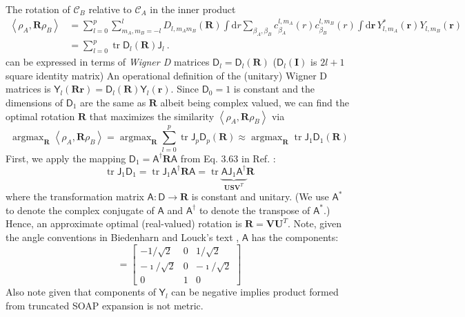 \documentclass[journal=jctcce,manuscript=article]{achemso}
\newcommand{\cref}[1]{{Ref. \citenum{#1}}}
\newcommand{\neighborhood}{\mathcal{C}}
\newcommand{\tr}{\operatorname{tr}}
\newcommand{\argmax}{\operatorname{argmax}}
\newcommand{\As}{\mathsf{A}}
\newcommand{\rb}{\mathbf{r}}
\newcommand{\Rb}{\mathbf{R}}
\newcommand{\Ib}{\mathbf{I}}
\newcommand{\Js}{\mathsf{J}}
\newcommand{\Ub}{\mathbf{U}}
\newcommand{\Vb}{\mathbf{V}}
\newcommand{\Ys}{\mathsf{Y}}
\newcommand{\Sb}{\mathbf{S}}
\newcommand{\Ds}{\mathsf{D}}
\begin{document}
The rotation of $\neighborhood_B$ relative to $\neighborhood_A$ in the inner product 
\begin{equation}
\begin{aligned}
\left<\rho_A,\Rb \rho_B\right> &= 
\sum_{l=0}^p \sum_{m_A,m_B=-l}^l  D_{l, m_A m_B}(\Rb) \int \mathrm{d}r  
\sum_{\beta_A, \beta_B} c_{\beta_A}^{l, m_A}(r)  c_{\beta_B}^{l, m_B}(r)
\int \mathrm{d}\rb \, Y^*_{l, m_A} (\rb) Y_{l, m_B}(\rb) \\
&= \sum_{l=0}^p \tr \Ds_l(\Rb) \Js_l \ .
\end{aligned}
\end{equation}
can be expressed in terms of \emph{Wigner D} matrices $\Ds_l = \Ds_l(\Rb)$ ($\Ds_l(\Ib)$ is $2l+1$ square identity matrix)
An operational definition of the (unitary) Wigner D matrices is $ \Ys_l(\Rb \rb) = \Ds_l(\Rb) \Ys_l(\rb) $. 
Since  $\Ds_0 = 1 $ is constant and the dimensions of $\Ds_1$ are the same as $\Rb$ albeit being complex valued,
we can find the optimal rotation $\Rb$ that maximizes the similarity $\left<\rho_A,\Rb \rho_B\right>$ via
\begin{equation}
\argmax_\Rb \left<\rho_A,\Rb \rho_B\right>  =
\argmax_\Rb \sum_{l=0}^p \tr \Js_p \Ds_p(\Rb) 
\approx \argmax_\Rb \tr \Js_1 \Ds_1(\Rb)
\end{equation}
First, we apply the mapping $ \Ds_1 = \As^\dagger \Rb \As $ from Eq. 3.63 in \cref{BiedenharnLouck}:
\begin{equation}
\tr \Js_1 \Ds_1
= \tr \Js_1 \As^\dagger \Rb \As  
= \tr \underbrace{ \As \Js_1 \As^\dagger }_{\Ub \Sb \Vb^T} \Rb
\end{equation}
where the transformation matrix $\As: \Ds \rightarrow \Rb$ is constant and unitary.
(We use $\As^*$ to denote the complex conjugate of $\As$ and $\As^\dagger$ to denote the transpose of $\As^*$.)
Hence, an approximate optimal (real-valued) rotation is $\Rb = \Vb \Ub^T$.
Note, given the angle conventions in Biedenharn and Louck's text \cite{BiedenharnLouck}, $\As$ has the components:
\begin{equation}
[ \As ] = 
\begin{bmatrix} 
-1/\sqrt{2} & 0 & 1/\sqrt{2} \\
-\imath/\sqrt{2} & 0 & -\imath/\sqrt{2} \\
0 & 1 & 0
\end{bmatrix}
\end{equation}
Also note given that components of  $\Ys_l$ can be negative implies product formed from truncated SOAP expansion is not metric.


\end{document}
